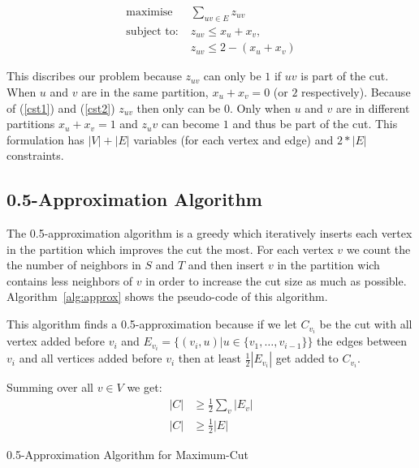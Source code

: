 \documentclass[twocolumn]{article}
\begin{document}
\begin{align}
  \text{maximise} \; & \sum_{uv \in E} z_{uv} \\
  \text{subject to:} \; & z_{uv} \leq x_u + x_v, \label{cst1} \\
  & z_{uv} \leq 2 - (x_u + x_v) \label{cst2}
\end{align}

This discribes our problem because $z_{uv}$ can only be $1$ if $uv$ is part of the cut. 
When $u$ and $v$ are in the same partition, $x_u + x_v = 0$ (or $2$ respectively).
Because of (\ref{cst1}) and (\ref{cst2}) $z_{uv}$ then only can be $0$.
Only when $u$ and $v$ are in different partitions $x_u + x_v = 1$ and $z_uv$ can become
$1$ and thus be part of the cut.
This formulation has $|V| + |E|$ variables (for each vertex and edge) and $2 * |E|$ constraints.

\subsection{0.5-Approximation Algorithm}

The 0.5-approximation algorithm is a greedy which iteratively inserts each vertex in the partition
which improves the cut the most. For each vertex $v$ we count the the number of neighbors in
$S$ and $T$ and then insert $v$ in the partition wich contains less neighbors of $v$ in order
to increase the cut size as much as possible. Algorithm~\ref{alg:approx} shows the pseudo-code
of this algorithm.

This algorithm finds a 0.5-approximation because if we let $C_{v_i}$ be the cut with all vertex added
before $v_i$ and $E_{v_i} = \{(v_i, u) | u \in \{v_1, \dots, v_{i -1}\}\}$ the edges between $v_i$
and all vertices added before $v_i$ then at least $\frac{1}{2}|E_{v_i}|$ get added to $C_{v_i}$.

Summing over all $v \in V$ we get:
\begin{align*}
  |C| & \geq \frac{1}{2} \sum_{v} |E_v| \\
  |C| & \geq \frac{1}{2} |E|
\end{align*}




\begin{algorithm}
  \caption{0.5-Approximation Algorithm for Maximum-Cut}
  \label{alg:approx}
\end{algorithm}
\end{document}
